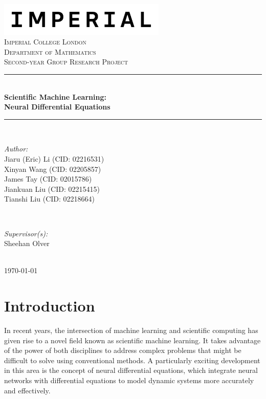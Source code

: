 \documentclass[a4paper,11pt,titlepage]{article}
\theoremstyle{definition}
\theoremstyle{plain}
\theoremstyle{remark}
\newcommand{\reporttitle}{Scientific Machine Learning:\\Neural Differential Equations}
\newcommand{\reportauthorA}{Jiaru (Eric) Li (CID: 02216531)}
\newcommand{\reportauthorB}{Xinyan Wang (CID: 02205857)}
\newcommand{\reportauthorC}{James Tay (CID: 02015786)}
\newcommand{\reportauthorD}{Jiankuan Liu (CID: 02215415)}
\newcommand{\reportauthorE}{Tianshi Liu (CID: 02218664)}
\newcommand{\supervisor}{Sheehan Olver}
\begin{document}
\begin{titlepage}
\newcommand{\HRule}{\rule{\linewidth}{0.5mm}}
\includegraphics[width=8cm]{figures/Imperial_logo.png}\\[1cm]
\center
\textsc{\LARGE Imperial College London}\\[0.5cm] 
\textsc{\Large Department of Mathematics}\\[1.5cm] 
\textsc{\Large Second-year Group Research Project}\\[0.5cm]
\makeatletter
\HRule \\[0.6cm]
{\huge \bfseries \reporttitle}\\[0.6cm]
\HRule \\[1.5cm]
\begin{minipage}{0.4\textwidth}
\begin{flushleft} \large
\emph{Author:}\\
\reportauthorA \\
\reportauthorB \\
\reportauthorC \\
\reportauthorD \\
\reportauthorE
\end{flushleft}
\end{minipage}
~
\begin{minipage}{0.4\textwidth}
\begin{flushright} \large
\emph{Supervisor(s):} \\
\supervisor
\end{flushright}
\end{minipage}\\[2cm]
\makeatother
\vfill
\makeatletter
{\large \today}\\[2cm]
\makeatother
\end{titlepage}

\begin{abstract}

\end{abstract}

\tableofcontents

\pagebreak
\section{Introduction}

In recent years, the intersection of machine learning and scientific computing has given rise to a novel field known as scientific machine learning. It takes advantage of the power of both disciplines to address complex problems that might be difficult to solve using conventional methods. A particularly exciting development in this area is the concept of neural differential equations, which integrate neural networks with differential equations to model dynamic systems more accurately and effectively.
\end{document}
